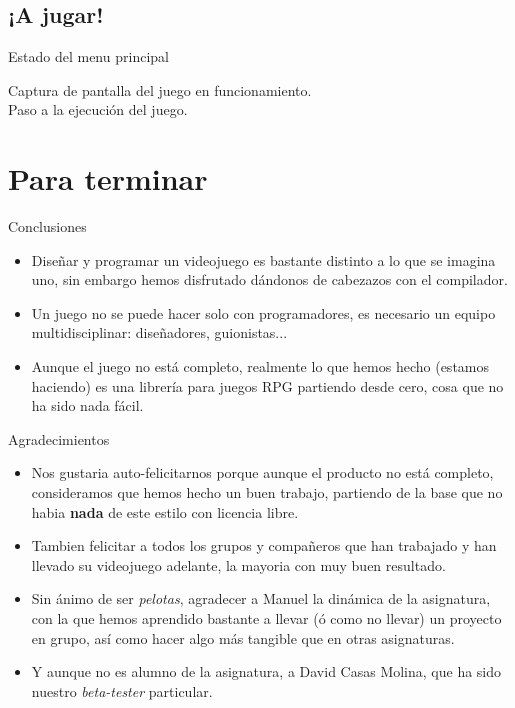 \documentclass[9pt,xcolor=svgnames]{beamer}
\begin{document}
  \subsection{¡A jugar!}
 \begin{frame}{Estado del menu principal}
   \transdissolve

  Captura de pantalla del juego en funcionamiento.\\

  Paso a la ejecución del juego.
 \end{frame}
 
 \section{Para terminar}
 \begin{frame}{Conclusiones}
   \transdissolve
   \begin{itemize}
   \item Diseñar y programar un videojuego es bastante distinto a lo que se
     imagina uno, sin embargo hemos disfrutado dándonos de cabezazos con
     el compilador.
   \item Un juego no se puede hacer solo con programadores, es necesario un
     equipo multidisciplinar: diseñadores, guionistas...
   \item Aunque el juego no está completo, realmente lo que hemos hecho 
     (estamos haciendo) es una librería para juegos RPG partiendo desde
     cero, cosa que no ha sido nada fácil.
   \end{itemize}
 \end{frame}

 \begin{frame}{Agradecimientos}
   \transdissolve
   \begin{itemize}
   \item Nos gustaria auto-felicitarnos porque aunque el producto no está 
     completo, consideramos que hemos hecho un buen trabajo, partiendo de
     la base que no habia \textbf{nada} de este estilo con licencia libre.
   \item Tambien felicitar a todos los grupos y compañeros que han trabajado
     y han llevado su videojuego adelante, la mayoria con muy buen resultado.
   \item Sin ánimo de ser \textit{pelotas}, agradecer a Manuel la dinámica de
     la asignatura, con la que hemos aprendido bastante a llevar (ó como no
     llevar) un proyecto en grupo, así como hacer algo más tangible que
     en otras asignaturas.
   \item Y aunque no es alumno de la asignatura, a David Casas Molina, que ha
     sido nuestro \textit{beta-tester} particular.
   \end{itemize}
 \end{frame}
\end{document}

